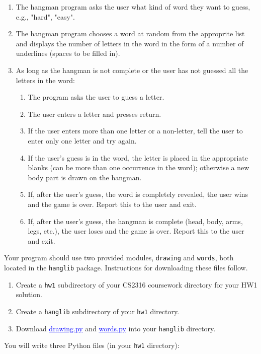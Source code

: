 \documentclass[12pt]{article}
\newcommand{\link}[2]{\href{#1}{\textcolor{blue}{\underline{#2}}}}
\newcommand{\code}{http://www.cc.gatech.edu/~simpkins/teaching/gatech/cs2316/code}
\begin{document}
\begin{enumerate}
\item The hangman program asks the user what kind of word they want to guess, e.g., "hard", "easy".
\item The hangman program chooses a word at random from the approprite list and displays the number of letters in the word in the form of a number of underlines (spaces to be filled in).
\item As long as the hangman is not complete or the user has not guessed all the letters in the word:
\begin{enumerate}
\item The program asks the user to guess a letter.
\item The user enters a letter and presses return.
\item If the user enters more than one letter or a non-letter, tell the user to enter only one letter and try again.
\item If the user's guess is in the word, the letter is placed in the appropriate blanks (can be more than one occurrence in the word); otherwise a new body part is drawn on the hangman.
\item If, after the user's guess, the word is completely revealed, the user wins and the game is over.  Report this to the user and exit.
\item If, after the user's guess, the hangman is complete (head, body, arms, legs, etc.), the user loses and the game is over.  Report this to the user and exit.
\end{enumerate}
\end{enumerate}

Your program should use two provided modules, {\tt drawing} and {\tt words}, both located in the {\tt hanglib} package.  Instructions for downloading these files follow.

\begin{enumerate}
\itemsep0em
\item Create a {\tt hw1} subdirectory of your CS2316 coursework directory for your HW1 solution.
\item Create a {\tt hanglib} subdirectory of your {\tt hw1} directory.
\item Download \link{\code/hanglib/drawing.py}{drawing.py} and \link{\code/hanglib/words.py}{words.py} into your {\tt hanglib} directory.
\end{enumerate}

You will write three Python files (in your {\tt hw1} directory):
\end{document}
